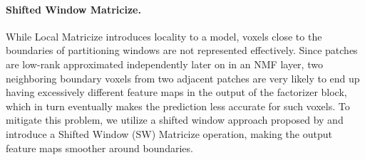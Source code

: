 \documentclass[a4,12pt]{article}
\begin{document}
	\paragraph{Shifted Window Matricize.}
	While Local Matricize introduces locality to a model, voxels close to the boundaries of partitioning windows are not represented effectively. Since patches are low-rank approximated independently later on in an NMF layer, two neighboring boundary voxels from two adjacent patches are very likely to end up having excessively different feature maps in the output of the factorizer block, which in turn eventually makes the prediction less accurate for such voxels. To mitigate this problem, we utilize a shifted window approach proposed by \citet{liu2021swin} and introduce a Shifted Window (SW) Matricize operation, making the output feature maps smoother around boundaries. 
	
\end{document}
